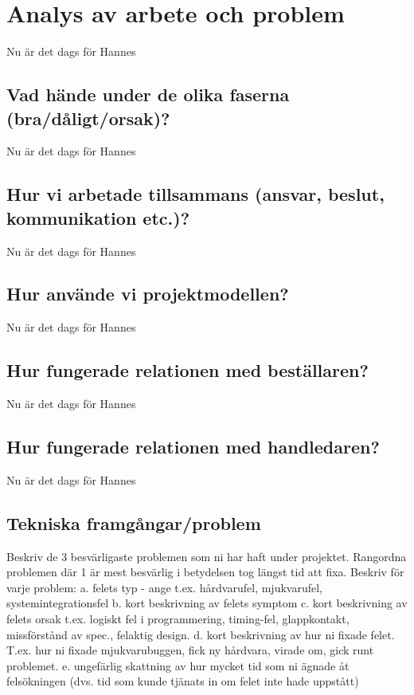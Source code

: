 \documentclass[a4paper,titlepage,12pt]{article}
\begin{document}
	\section{Analys av arbete och problem}
	Nu är det dags för Hannes
	
	\subsection{Vad hände under de olika faserna (bra/dåligt/orsak)?}
	Nu är det dags för Hannes
	
	\subsection{Hur vi arbetade tillsammans (ansvar, beslut, kommunikation etc.)?}
	Nu är det dags för Hannes
	
	\subsection{Hur använde vi projektmodellen?}
	Nu är det dags för Hannes
	
	\subsection{Hur fungerade relationen med beställaren?}
	Nu är det dags för Hannes
	
	\subsection{Hur fungerade relationen med handledaren?}
	Nu är det dags för Hannes
	
	\subsection{Tekniska framgångar/problem}
	Beskriv de 3 besvärligaste problemen som ni har haft under projektet. 
	Rangordna problemen där 1 är mest besvärlig i betydelsen tog längst tid att fixa.
	Beskriv för varje problem:
	a. felets typ - ange t.ex.  hårdvarufel, mjukvarufel, systemintegrationsfel 
	b. kort beskrivning av felets symptom 
	c. kort beskrivning av felets orsak t.ex. logiskt fel i programmering, timing-fel, glappkontakt, missförstånd av spec., felaktig design. 
	d. kort beskrivning av hur ni fixade felet. T.ex. hur ni fixade mjukvarubuggen, fick ny hårdvara, virade om, gick runt problemet.
	e. ungefärlig skattning av hur mycket tid som ni ägnade åt felsökningen (dvs. tid som kunde tjänats in om felet inte hade uppstått)
	
\end{document}
